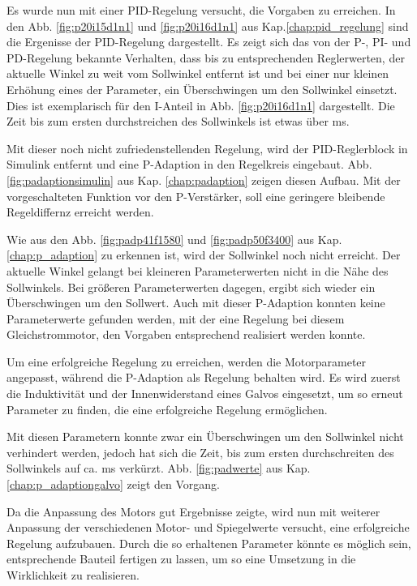 Es wurde nun mit einer PID-Regelung versucht, die Vorgaben zu erreichen.
In den Abb. \ref{fig:p20i15d1n1} und \ref{fig:p20i16d1n1} aus Kap.\ref{chap:pid_regelung} sind die Ergenisse der PID-Regelung dargestellt.
Es zeigt sich das von der P-, PI- und PD-Regelung bekannte Verhalten, dass bis zu entsprechenden Reglerwerten, der aktuelle Winkel zu weit vom Sollwinkel entfernt ist und
bei einer nur kleinen Erhöhung eines der Parameter, ein Überschwingen um den Sollwinkel einsetzt.
Dies ist exemplarisch für den I-Anteil in Abb. \ref{fig:p20i16d1n1} dargestellt.
Die Zeit bis zum ersten durchstreichen des Sollwinkels ist etwas über \unit[8]{ms}.

Mit dieser noch nicht zufriedenstellenden Regelung, wird der PID-Reglerblock in Simulink entfernt und eine P-Adaption in den Regelkreis eingebaut.
Abb. \ref{fig:padaptionsimulin} aus Kap. \ref{chap:padaption} zeigen diesen Aufbau.
Mit der vorgeschalteten Funktion vor den P-Verstärker, soll eine geringere bleibende Regeldiffernz erreicht werden.

Wie aus den Abb. \ref{fig:padp41f1580} und \ref{fig:padp50f3400} aus Kap.\ref{chap:p_adaption} zu erkennen ist, wird der Sollwinkel noch nicht erreicht.
Der aktuelle Winkel gelangt bei kleineren Parameterwerten nicht in die Nähe des Sollwinkels.
Bei größeren Parameterwerten dagegen, ergibt sich wieder ein Überschwingen um den Sollwert.
Auch mit dieser P-Adaption konnten keine Parameterwerte gefunden werden, mit der eine Regelung bei diesem Gleichstrommotor, den Vorgaben entsprechend realisiert werden 
konnte.

Um eine erfolgreiche Regelung zu erreichen, werden die Motorparameter angepasst, während die P-Adaption als Regelung behalten wird.
Es wird zuerst die Induktivität und der Innenwiderstand eines Galvos eingesetzt, um so erneut Parameter zu finden, die eine erfolgreiche Regelung ermöglichen.

Mit diesen Parametern konnte zwar ein Überschwingen um den Sollwinkel nicht verhindert werden, jedoch hat sich die Zeit, bis zum ersten durchschreiten des Sollwinkels auf
ca. \unit[2]{ms} verkürzt.
Abb. \ref{fig:padwerte} aus Kap. \ref{chap:p_adaptiongalvo} zeigt den Vorgang.

Da die Anpassung des Motors gut Ergebnisse zeigte, wird nun mit weiterer Anpassung der verschiedenen Motor- und Spiegelwerte versucht, eine erfolgreiche Regelung aufzubauen.
Durch die so erhaltenen Parameter könnte es möglich sein, entsprechende Bauteil fertigen zu lassen, um so eine Umsetzung in die Wirklichkeit zu realisieren.

